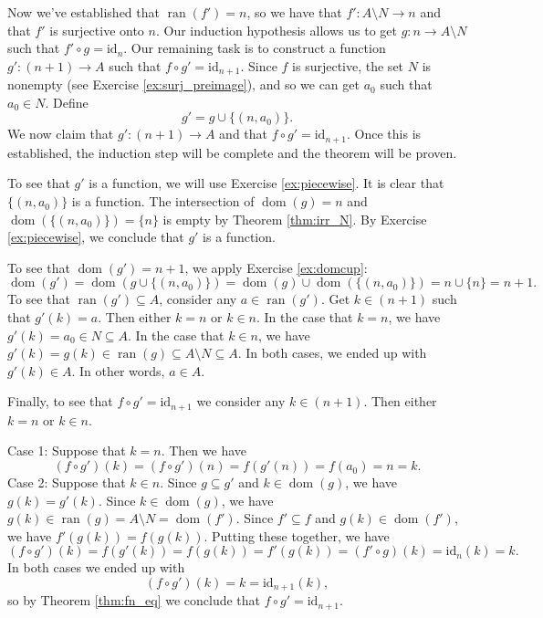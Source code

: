 \documentclass[12pt]{article}
\newcommand{\dom}[1]{\operatorname{dom}(#1)}
\newcommand{\ran}[1]{\operatorname{ran}(#1)}
\newcommand{\id}[1]{\textrm{id}_{#1}}
\newcounter{theorem}
\begin{document}
{Now we've established that $\ran{f'}=n$, so we have that $f':A\setminus N\rightarrow n$ and that $f'$ is surjective onto $n$.
Our induction hypothesis allows us to get $g:n\rightarrow A\setminus N$ such that $f'\circ g=\id{n}$.
Our remaining task is to construct a function $g':(n+1)\rightarrow A$ such that $f\circ g'=\id{n+1}$.
Since $f$ is surjective, the set $N$ is nonempty (see Exercise \ref{ex:surj_preimage}),
and so we can get $a_0$ such that $a_0\in N$. Define
$$
g'=g\cup\{(n,a_0)\}.
$$
We now claim that $g':(n+1)\rightarrow A$ and that $f\circ g'=\id{n+1}$. Once this is established, the induction step will be complete and the theorem will be proven.

To see that $g'$ is a function, we will use Exercise \ref{ex:piecewise}.
It is clear that $\{(n,a_0)\}$ is a function.
The intersection of $\dom{g}=n$ and $\dom{\{(n,a_0)\}}=\{n\}$
is empty by Theorem \ref{thm:irr_N}. By Exercise \ref{ex:piecewise}, we conclude that $g'$ is a function.

To see that $\dom{g'}=n+1$, we apply Exercise \ref{ex:domcup}:
$$
\dom{g'}=\dom{g\cup \{(n,a_0)\}}=\dom{g}\cup\dom{\{(n,a_0)\}}=n\cup\{n\}=n+1.
$$
To see that $\ran{g'}\subseteq A$, consider any $a\in\ran{g'}$.
Get $k\in(n+1)$ such that $g'(k)=a$.
Then either $k=n$ or $k\in n$.
In the case that $k=n$, we have $g'(k)=a_0\in N\subseteq A$.
In the case that $k\in n$, we have $g'(k)=g(k)\in\ran{g}\subseteq A\setminus N\subseteq A$.
In both cases, we ended up with $g'(k)\in A$. In other words, $a\in A$.

Finally, to see that $f\circ g'=\id{n+1}$ we consider any $k\in (n+1)$.
Then either $k=n$ or $k\in n$.

Case 1: Suppose that $k=n$. Then we have
$$
(f\circ g')(k) =
(f\circ g')(n) =
f(g'(n)) =
f(a_0)=n = k.
$$
Case 2: Suppose that $k\in n$.
Since $g\subseteq g'$ and $k\in\dom{g}$, we have $g(k)=g'(k)$.
Since $k\in\dom{g}$, we have $g(k)\in\ran{g}=A\setminus N = \dom{f'}$.
Since $f'\subseteq f$ and $g(k)\in\dom{f'}$, we have $f'(g(k))=f(g(k))$.
Putting these together, we have
$$
(f\circ g')(k) =
f(g'(k)) =
f(g(k)) = 
f'(g(k)) = 
(f'\circ g)(k)=
\id{n}(k)=
k.
$$
In both cases we ended up with 
$$(f\circ g')(k) = k = \id{n+1}(k), $$
so by Theorem \ref{thm:fn_eq} we conclude that $f\circ g'=\id{n+1}$.
}
\end{document}
